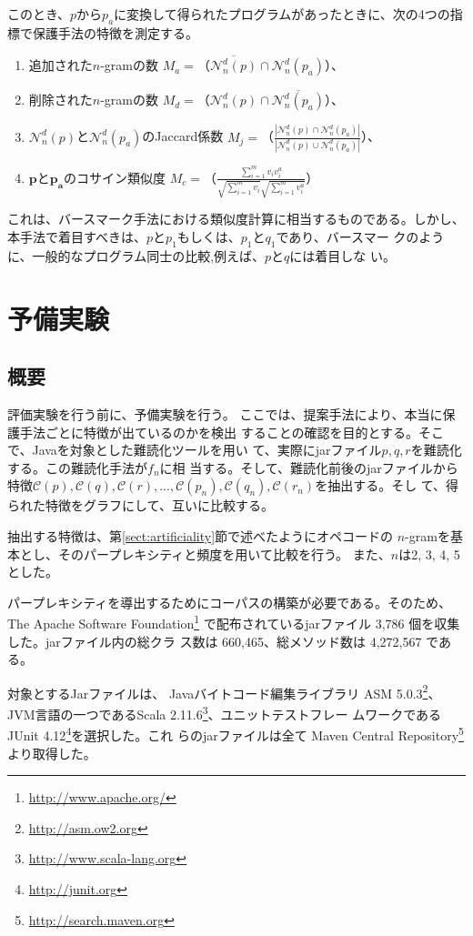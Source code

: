 \documentclass[12pt,twoside]{jreport}
\newcommand{\birth}[1]{\mathcal{C}(#1)}
\newcommand{\distinct}[1]{\mathcal{N}_n^d(#1)}
\begin{document}
このとき、$p$から$p_a$に変換して得られたプログラムがあったときに、次の4つの指標で保護手法の特徴を測定する。
\begin{enumerate}
\item 追加された$n$-gramの数 $M_a=$（$\overline{\distinct{p}} \cap \distinct{p_a}$）、
\item 削除された$n$-gramの数 $M_d=$（$\distinct{p} \cap \overline{\distinct{p_a}}$）、
\item $\distinct{p}$と$\distinct{p_a}$のJaccard係数 $M_j=$（$\displaystyle
  \frac{|\distinct{p} \cap \distinct{p_a}|}{|\distinct{p} \cup
    \distinct{p_a}|}$）、
\item $\bm{p}$と$\bm{p_a}$のコサイン類似度 $M_c=$（$\displaystyle
  \frac{\sum_{i=1}^{m} v_i v^a_i}{\sqrt{\sum_{i=1}^m v_i}
    \sqrt{\sum_{i=1}^m v^a_i}}$）
\end{enumerate}

これは、バースマーク手法における類似度計算に相当するものである。しかし、
本手法で着目すべきは、$p$と$p_1$もしくは、$p_1$と$q_1$であり、バースマー
クのように、一般的なプログラム同士の比較,例えば、$p$と$q$には着目しな
い。

\chapter{予備実験}

\section{概要}
評価実験を行う前に、予備実験を行う。
ここでは、提案手法により、本当に保護手法ごとに特徴が出ているのかを検出
することの確認を目的とする。そこで、Javaを対象とした難読化ツールを用い
て、実際にjarファイル$p, q, r$を難読化する。この難読化手法が$f_n$に相
当する。そして、難読化前後のjarファイルから特徴$\birth{p}, \birth{q},
\birth{r}, ..., \birth{p_n}, \birth{q_n}, \birth{r_n}$を抽出する。そし
て、得られた特徴をグラフにして、互いに比較する。

抽出する特徴は、第\ref{sect:artificiality}節で述べたようにオペコードの
$n$-gramを基本とし、そのパープレキシティと頻度を用いて比較を行う。
また、$n$は2, 3, 4, 5とした。

パープレキシティを導出するためにコーパスの構築が必要である。そのため、
The Apache Software Foundation\footnote{\url{http://www.apache.org/}}
で配布されているjarファイル 3,786 個を収集した。jarファイル内の総クラ
ス数は 660,465、総メソッド数は 4,272,567 である。

対象とするJarファイルは、
Javaバイトコード編集ライブラリ ASM
5.0.3\footnote{\url{http://asm.ow2.org}}、JVM言語の一つであるScala
2.11.6\footnote{\url{http://www.scala-lang.org}}、ユニットテストフレー
ムワークである JUnit 4.12\footnote{\url{http://junit.org}}を選択した。これ
らのjarファイルは全て Maven Central
Repository\footnote{\url{http://search.maven.org}} より取得した。
\end{document}
